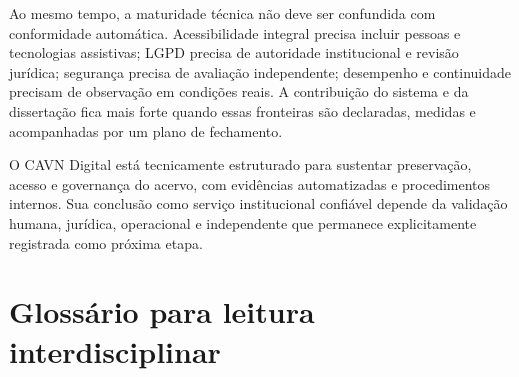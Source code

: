 \documentclass[11pt,a4paper]{article}
\begin{document}
Ao mesmo tempo, a maturidade técnica não deve ser confundida com conformidade automática. Acessibilidade integral precisa incluir pessoas e tecnologias assistivas; LGPD precisa de autoridade institucional e revisão jurídica; segurança precisa de avaliação independente; desempenho e continuidade precisam de observação em condições reais. A contribuição do sistema e da dissertação fica mais forte quando essas fronteiras são declaradas, medidas e acompanhadas por um plano de fechamento.

\begin{conceptbox}[title=Formulação final]
O CAVN Digital está tecnicamente estruturado para sustentar preservação, acesso e governança do acervo, com evidências automatizadas e procedimentos internos. Sua conclusão como serviço institucional confiável depende da validação humana, jurídica, operacional e independente que permanece explicitamente registrada como próxima etapa.
\end{conceptbox}

\appendix
\section{Glossário para leitura interdisciplinar}
\end{document}
